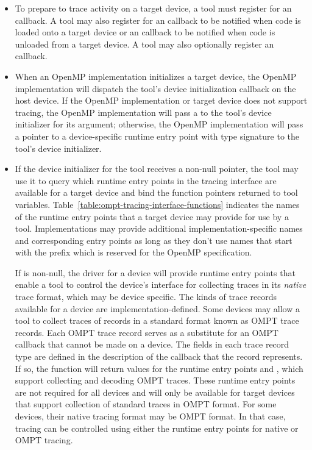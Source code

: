 \begin{itemize}
\item To prepare to trace activity on a target device, a tool must register for an
   callback.  A tool may also register for an
   callback to be notified when code is loaded onto a target device or
an  callback to be notified when code is unloaded from a target device.
A tool may also optionally register an  callback.
\item When an OpenMP implementation initializes a target device, the
  OpenMP implementation will dispatch the tool's device initialization
  callback on the host device. If the OpenMP implementation or target device does not support tracing,
  the OpenMP implementation will pass a  to the tool's device initializer for its
   argument; otherwise, the OpenMP implementation will pass
  a pointer to a device-specific runtime entry point with type
  signature  to the tool's device initializer.
\item If the device initializer for the tool receives a
  non-null  pointer, the tool may use it to query
  which runtime entry points in the tracing interface are available for a target device
  and bind the function pointers returned to tool variables.
  Table~\ref{table:ompt-tracing-interface-functions} indicates the
  names of the runtime entry points that a target device may provide for use
  by a tool.
  Implementations
may provide additional implementation-specific names and corresponding
entry points as long as they don't use names that start with the prefix
 which is reserved for the OpenMP specification.

  If  is non-null, the driver for a device will
  provide runtime entry points that enable a tool to control the device's
  interface for collecting traces in its \emph{native} trace format,
  which may be device specific.
  The kinds of trace records available for a device are
  implementation-defined.
  Some devices may allow a tool to
  collect traces of records in a standard format known as OMPT trace
  records. Each OMPT trace record serves as a substitute for an OMPT
  callback that cannot be made on a device. The fields in each trace
  record type are defined in the description of the callback that the
  record represents.  If so, the  function will
  return values for the runtime entry points
   and , which support
  collecting and decoding OMPT traces.
  These runtime entry points are not required for all devices and will only be available for target devices that support
  collection of standard traces in OMPT format.
  For some devices, their native
  tracing format may be OMPT format. In that case, tracing can be
  controlled using either the runtime entry points for native or OMPT
  tracing.


\end{itemize}
